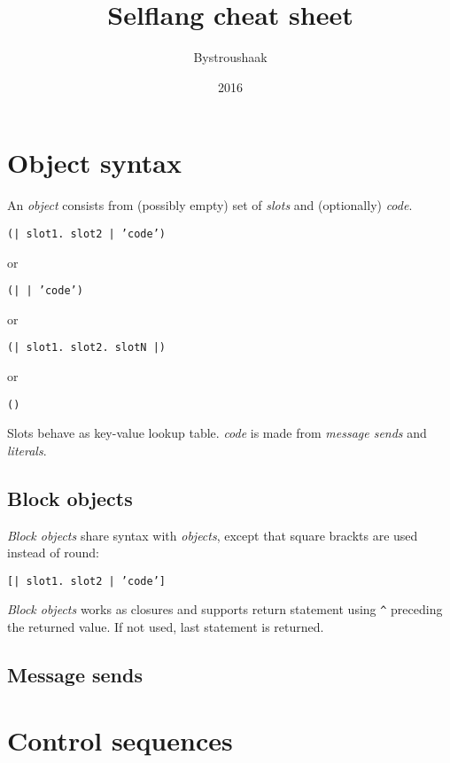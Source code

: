 \documentclass[10pt]{article}
\title{Selflang cheat sheet}
\author{Bystroushaak}
\date{2016}
\renewcommand{\maketitle}{
    {\begin{center}\Large \mythetitle\end{center}}
}
\begin{document}
\begin{multicols*}{3}
\maketitle

\section{Object syntax}
An \textit{object} consists from (possibly empty) set of \textit{slots} and (optionally) \textit{code}.

\vspace*{0.2cm}
\texttt{(| slot1. slot2 | 'code')}

or

\texttt{(| | 'code')}

or

\texttt{(| slot1. slot2. slotN |)}

or

\texttt{()}
\vspace*{0.2cm}

Slots behave as key-value lookup table. \textit{code} is made from \textit{message sends} and \textit{literals}.

\subsection{Block objects}
\textit{Block objects} share syntax with \textit{objects}, except that square brackts are used instead of round:

\vspace*{0.2cm}
\texttt{[| slot1. slot2 | 'code']}
\vspace*{0.2cm}

\textit{Block objects} works as closures and supports return statement using \texttt{\^} preceding the returned value. If not used, last statement is returned.


\subsection{Message sends}





\section{Control sequences}

\end{multicols*}
\end{document}
